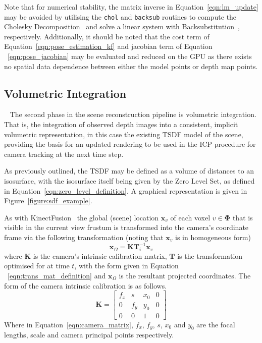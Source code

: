 Note that for numerical stability, the matrix inverse in Equation~\ref{eqn:lm_update} 
may be avoided by utilising the \texttt{chol} and \texttt{backsub} routines to 
compute the Cholesky Decomposition~\cite{NumericalRecipes} and solve a linear system with 
Backsubstitution~\cite{ElemLinAlg}, respectively. Additionally, it should be noted that 
the cost term of Equation~\ref{eqn:pose_estimation_kf} and jacobian term of Equation
~\ref{eqn:pose_jacobian} may be evaluated and reduced on the GPU as there exists no spatial 
data dependence between either the model points or depth map points.

\subsection{Volumetric Integration}
~\label{subsec:moseg_static_integration}
The second phase in the scene reconstruction pipeline is volumetric integration.
That is, the integration of observed depth images into a consistent, implicit
volumetric representation, in this case the existing TSDF model of the scene,
providing the basis for an updated rendering to be used in the ICP procedure
for camera tracking at the next time step.

As previously outlined, the TSDF may be defined as a volume of distances to an
isosurface, with the isosurface itself being given by the Zero Level Set, as
defined in Equation~\ref{eqn:zero_level_definition}. A graphical representation
is given in Figure~\ref{figure:sdf_example}.

As with KinectFusion~\cite{Newcombe2011} the global (scene) location
\(\bm{x}_{v}\) of each voxel \(v \in \bm{\Phi}\) that is visible in the
current view frustum is transformed into the camera's coordinate frame via the
following transformation (noting that \(\bm{x}_{v}\) is in homogeneous form)
\begin{equation}
\label{eqn:project_tsdf_to_image}
\bm{x}_{\Omega} = \bm{K}\bm{T}_i^{-1}\bm{x}_{v}
\end{equation}
where \(\bm{K}\) is the camera's intrinsic calibration matrix, \(\bm{T}\) is
the transformation optimised for at time \(t\), with the form given in Equation
~\ref{eqn:trans_mat_definition} and \(\bm{x}_{\Omega}\) is the resultant
projected coordinates. The form of the camera intrinsic calibration is as 
follows.
\begin{equation}
  \label{eqn:camera_matrix}
  \bm{K} = 
  \begin{bmatrix}
    f_{x} & s & x_{0} & 0\\
    0 & f_{y} & y_{0} & 0\\
    0 & 0 & 1 & 0
  \end{bmatrix}
\end{equation}
Where in Equation~\ref{eqn:camera_matrix}, \(f_{x}\), \(f_{y}\), \(s\), \(x_{0}\) 
and \(y_{0}\) are the focal lengths, scale and camera principal points respectively.

